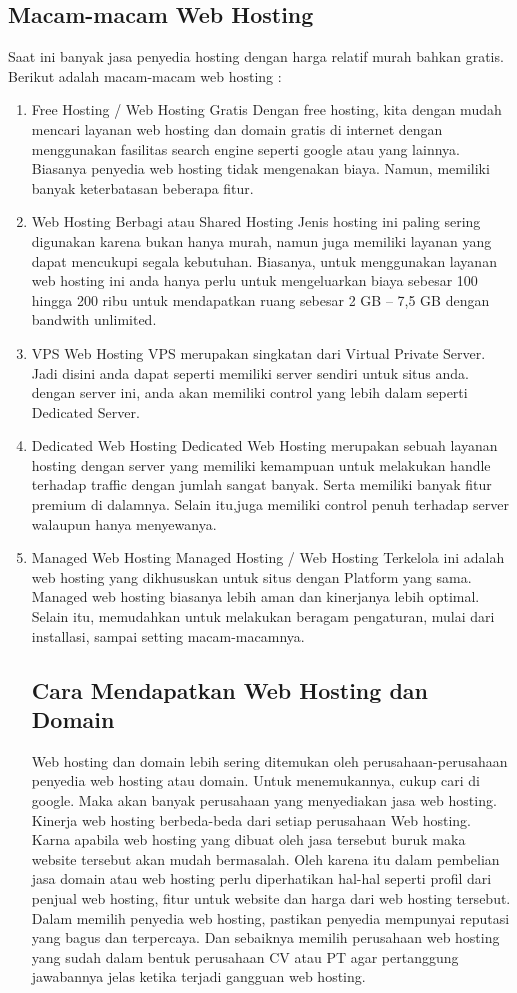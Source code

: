 \subsection{Macam-macam Web Hosting}
Saat ini banyak jasa penyedia hosting dengan harga relatif murah bahkan gratis.
Berikut adalah macam-macam web hosting :
\begin{enumerate}
\item Free Hosting / Web Hosting Gratis
	  Dengan free hosting, kita dengan mudah mencari layanan web hosting dan domain gratis di internet dengan
	  menggunakan fasilitas search engine seperti google atau yang lainnya. Biasanya penyedia web hosting
	  tidak mengenakan biaya. Namun, memiliki banyak keterbatasan beberapa fitur.
\item Web Hosting Berbagi atau Shared Hosting
	  Jenis hosting ini paling sering digunakan karena bukan hanya murah, namun juga memiliki layanan yang
	  dapat mencukupi segala kebutuhan. Biasanya, untuk menggunakan layanan web hosting ini anda hanya perlu
	  untuk mengeluarkan
	  biaya sebesar 100 hingga 200 ribu untuk mendapatkan ruang sebesar 2 GB – 7,5 GB dengan bandwith
	  unlimited.
\item VPS Web Hosting
	  VPS merupakan singkatan dari Virtual Private Server. Jadi disini anda dapat seperti memiliki server
	  sendiri untuk situs anda. dengan server ini, anda akan memiliki control yang lebih dalam seperti
	  Dedicated Server.
\item Dedicated Web Hosting
	  Dedicated Web Hosting merupakan sebuah layanan hosting dengan server yang memiliki kemampuan untuk
	  melakukan handle terhadap traffic dengan jumlah sangat banyak. Serta memiliki banyak fitur premium di
	  dalamnya. Selain itu,juga memiliki control penuh terhadap server walaupun  hanya menyewanya.
\item Managed Web Hosting
	  Managed Hosting / Web Hosting Terkelola ini adalah web hosting yang dikhususkan untuk situs dengan
	  Platform yang sama. Managed web hosting biasanya lebih aman dan kinerjanya lebih optimal. Selain itu,
	  memudahkan untuk melakukan beragam pengaturan, mulai dari installasi, sampai setting macam-macamnya.

\subsection{Cara Mendapatkan Web Hosting dan Domain}
Web hosting dan domain lebih sering ditemukan oleh perusahaan-perusahaan penyedia web hosting atau domain. Untuk menemukannya, cukup cari di google. Maka akan banyak perusahaan yang menyediakan jasa web hosting. Kinerja web hosting berbeda-beda dari setiap perusahaan Web hosting. Karna apabila web hosting yang dibuat oleh jasa tersebut buruk maka website tersebut akan mudah bermasalah. Oleh karena itu dalam pembelian jasa domain atau web hosting perlu diperhatikan hal-hal seperti profil dari penjual web hosting, fitur untuk website dan harga dari web hosting tersebut. Dalam memilih penyedia web hosting, pastikan penyedia mempunyai reputasi yang bagus dan terpercaya. Dan sebaiknya memilih perusahaan web hosting yang sudah dalam bentuk perusahaan CV atau PT agar pertanggung jawabannya jelas ketika terjadi gangguan web hosting.
	

\end{enumerate}
